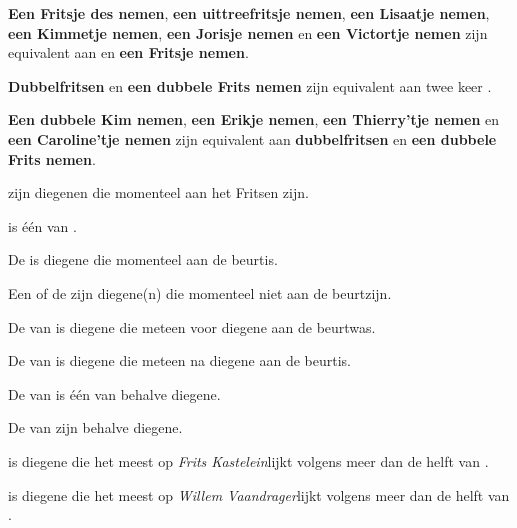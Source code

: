 \item \label{definitie:fritsen_equivalent}\textbf{Een Fritsje des nemen}, \textbf{een uittreefritsje nemen}, \textbf{een Lisaatje nemen}, \textbf{een Kimmetje nemen}, \textbf{een Jorisje nemen} en \textbf{een Victortje nemen}  zijn equivalent aan \Fritsen en \textbf{een Fritsje nemen}. 

\item \label{definitie:dubbelfritsen} \textbf{Dubbelfritsen} en \textbf{een dubbele Frits nemen} zijn equivalent aan twee keer \FritsenN.

\item \label{definitie:dubbelfritsen_equivalent} \textbf{Een dubbele Kim nemen}, \textbf{een Erikje nemen}, \textbf{een Thierry'tje nemen} en \\ \textbf{een Caroline'tje nemen} zijn equivalent aan \textbf{dubbelfritsen} en \textbf{een dubbele Frits nemen}.

\item \AlleSpelers zijn diegenen die momenteel aan het Fritsen zijn.

\item \EenSpeler is één van \alleSpelersN. 

\item De \huidigeSpeler is diegene die momenteel aan de beurt\footnotemark[1] is.  

\item Een \andereSpeler of de \andereSpelers zijn diegene(n) die momenteel niet aan de beurt\footnotemark[1] zijn. 

\item De \vorigeSpeler van \eenSpeler is diegene die meteen voor diegene aan de beurt\footnotemark[1] was. 

\item De \volgendeSpeler van \eenSpeler is diegene die meteen na diegene aan de beurt\footnotemark[1] is. 

\item De \medeSpeler van \eenSpeler is \'e\'en van \alleSpelers behalve diegene.

\item De \medeSpelers van \eenSpeler zijn \alleSpelers behalve diegene.

\item \Frits is diegene die het meest op \textit{Frits Kastelein}\footnotemark[2] lijkt volgens meer dan de helft van \alleSpelersN\footnotemark[3].

\item \Willem is diegene die het meest op \textit{Willem Vaandrager}\footnotemark[2] lijkt volgens meer dan de helft van \alleSpelersN\footnotemark[3].

